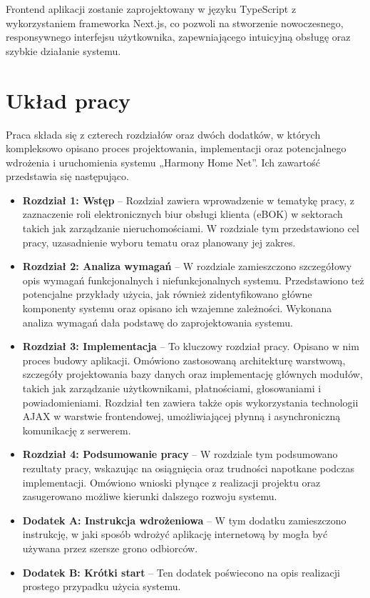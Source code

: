 Frontend aplikacji zostanie zaprojektowany w języku TypeScript z wykorzystaniem frameworka Next.js, co pozwoli na stworzenie nowoczesnego, responsywnego interfejsu użytkownika, zapewniającego intuicyjną obsługę oraz szybkie działanie systemu.

\section{Układ pracy}
Praca składa się z czterech rozdziałów oraz dwóch dodatków, w których kompleksowo opisano proces projektowania, implementacji 
oraz potencjalnego wdrożenia i uruchomienia systemu „Harmony Home Net”. Ich zawartość przedstawia się następująco.
\begin{itemize}
    \item \textbf{Rozdział 1: Wstęp} -- Rozdział zawiera wprowadzenie w tematykę pracy, z zaznaczenie roli elektronicznych biur obsługi klienta (eBOK) w sektorach takich jak zarządzanie nieruchomościami. W rozdziale tym przedstawiono cel pracy, uzasadnienie wyboru tematu oraz planowany jej zakres.
    \item \textbf{Rozdział 2: Analiza wymagań} -- W rozdziale zamieszczono szczegółowy opis wymagań funkcjonalnych i niefunkcjonalnych systemu. Przedstawiono też potencjalne przykłady użycia, jak również zidentyfikowano główne komponenty systemu oraz opisano ich wzajemne zależności. Wykonana analiza wymagań dała podstawę do zaprojektowania systemu.

    \item \textbf{Rozdział 3: Implementacja} -- To kluczowy rozdział pracy. Opisano w nim proces budowy aplikacji. Omówiono zastosowaną architekturę warstwową, szczegóły projektowania bazy danych oraz implementację głównych modułów, takich jak zarządzanie użytkownikami, płatnościami, głosowaniami i powiadomieniami. Rozdział ten zawiera także opis wykorzystania technologii AJAX w warstwie frontendowej, umożliwiającej płynną i asynchroniczną komunikację z serwerem.

    \item \textbf{Rozdział 4: Podsumowanie pracy} -- W rozdziale tym podsumowano rezultaty pracy, wskazując na osiągnięcia oraz trudności napotkane podczas implementacji. Omówiono wnioski płynące z realizacji projektu oraz zasugerowano możliwe kierunki dalszego rozwoju systemu.

    \item \textbf{Dodatek A: Instrukcja wdrożeniowa} -- W tym dodatku zamieszczono instrukcję, w jaki sposób wdrożyć aplikację internetową by mogła być używana przez szersze grono odbiorców.
		\item \textbf{Dodatek B: Krótki start} -- Ten dodatek poświecono na opis realizacji prostego przypadku użycia systemu.	
\end{itemize}



